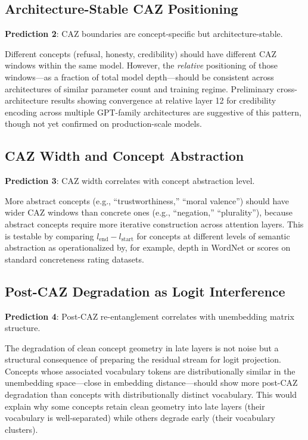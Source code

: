 \documentclass[11pt,a4paper]{article}
\begin{document}
\subsection{Architecture-Stable CAZ Positioning}

\textbf{Prediction 2}: CAZ boundaries are concept-specific but architecture-stable.

Different concepts (refusal, honesty, credibility) should have different CAZ windows
within the same model. However, the \emph{relative} positioning of those windows---as
a fraction of total model depth---should be consistent across architectures of similar
parameter count and training regime. Preliminary cross-architecture results showing
convergence at relative layer 12 for credibility encoding across multiple
GPT-family architectures are suggestive of this pattern, though not yet confirmed
on production-scale models.

\subsection{CAZ Width and Concept Abstraction}

\textbf{Prediction 3}: CAZ width correlates with concept abstraction level.

More abstract concepts (e.g., ``trustworthiness,'' ``moral valence'') should have
wider CAZ windows than concrete ones (e.g., ``negation,'' ``plurality''), because
abstract concepts require more iterative construction across attention layers.
This is testable by comparing $l_\text{end} - l_\text{start}$ for concepts at
different levels of semantic abstraction as operationalized by, for example,
depth in WordNet or scores on standard concreteness rating datasets.

\subsection{Post-CAZ Degradation as Logit Interference}

\textbf{Prediction 4}: Post-CAZ re-entanglement correlates with unembedding
matrix structure.

The degradation of clean concept geometry in late layers is not noise but a
structural consequence of preparing the residual stream for logit projection.
Concepts whose associated vocabulary tokens are distributionally similar in the
unembedding space---close in embedding distance---should show more post-CAZ
degradation than concepts with distributionally distinct vocabulary. This would
explain why some concepts retain clean geometry into late layers (their vocabulary
is well-separated) while others degrade early (their vocabulary clusters).
\end{document}
